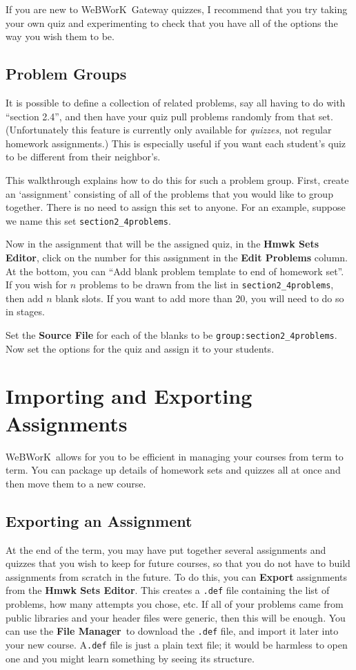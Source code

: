 \documentclass[12pt]{article}
\newcommand{\menu}[1]{\textbf{#1}}
\newcommand{\WW}{WeBWorK}
\newcommand{\HSE}{\menu{Hmwk Sets Editor}}
\newcommand{\FM}{\menu{File Manager}}
\begin{document}
If you are new to \WW\ Gateway quizzes, I recommend that you try taking your own quiz and experimenting to check that you have all of the options the way you wish them to be.

\subsection{Problem Groups}\label{groups}

It is possible to define a collection of related problems, say all having to do with ``section 2.4'', and then have your quiz pull problems randomly from that set. (Unfortunately this feature is currently only available for \emph{quizzes}, not regular homework assignments.) This is especially useful if you want each student's quiz to be different from their neighbor's.

This walkthrough explains how to do this for such a problem group. First, create an `assignment' consisting of all of the problems that you would like to group together. There is no need to assign this set to anyone. For an example, suppose we name this set \texttt{section2\_4problems}. 

Now in the assignment that will be the assigned quiz, in the \HSE, click on the number for this assignment in the {\bf Edit Problems} column. At the bottom, you can ``Add blank problem template to end of homework set''. If you wish for $n$ problems to be drawn from the list in \texttt{section2\_4problems}, then add $n$ blank slots. If you want to add more than $20$, you will need to do so in stages.

Set the {\bf Source File} for each of the blanks to be \texttt{group:section2\_4problems}. Now set the options for the quiz and assign it to your students.



\section{Importing and Exporting Assignments}\label{impexp}
\WW\ allows for you to be efficient in managing your courses from term to term. You can package up details of homework sets and quizzes all at once and then move them to a new course. 

\subsection{Exporting an Assignment}\label{exp}
At the end of the term, you may have put together several assignments and quizzes that you wish to keep for future courses, so that you do not have to build assignments from scratch in the future.  To do this, you can \menu{Export} assignments from the \HSE.  This creates a \texttt{.def} file containing the list of problems, how many attempts you chose, etc.  If all of your problems came from public libraries and your header files were generic, then this will be enough.  You can use the \FM\  to download the \texttt{.def} file, and import it later into your new course. A\texttt{.def} file is just a plain text file; it would be harmless to open one and you might learn something by seeing its structure.
\end{document}
